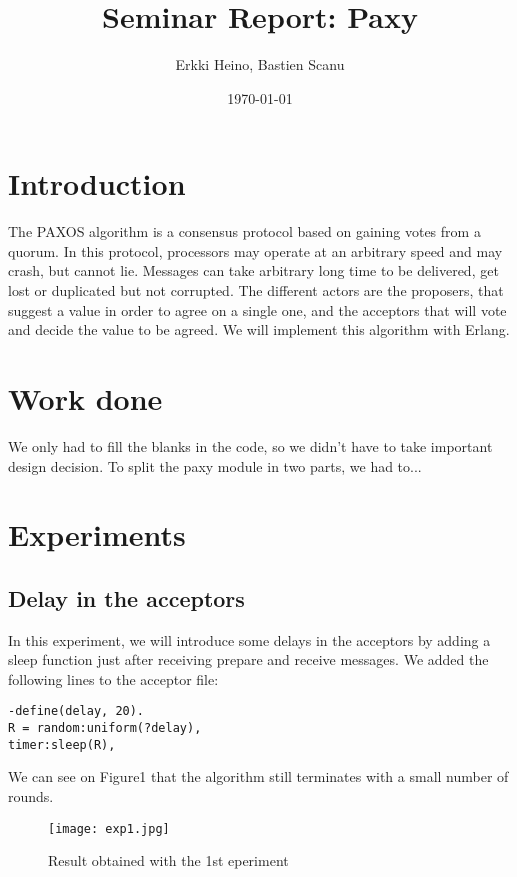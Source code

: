 \documentclass[a4paper, 11pt]{article}
\title{Seminar Report: Paxy}
\author{Erkki Heino, Bastien Scanu}
\date{\today{}}
\begin{document}
\maketitle

\section{Introduction}

The PAXOS algorithm is a consensus protocol based on gaining votes from a quorum. In this protocol, processors may operate at an arbitrary speed and may crash, but cannot lie. Messages can take arbitrary long time to be delivered, get lost or duplicated but not corrupted. The different actors are the proposers, that suggest a value in order to agree on a single one, and the acceptors that will vote and decide the value to be agreed. We will implement this algorithm with Erlang.

\section{Work done}

We only had to fill the blanks in the code, so we didn't have to take important design decision. To split the paxy module in two parts, we had to...

\section{Experiments}

\subsection{Delay in the acceptors}
In this experiment, we will introduce some delays in the acceptors by adding a sleep function just after receiving prepare and receive messages. We added the following lines to the acceptor file:
\begin{lstlisting}
-define(delay, 20).
R = random:uniform(?delay),
timer:sleep(R),
\end{lstlisting}
We can see on Figure1 that the algorithm still terminates with a small number of rounds.
\begin{figure}[h!]
\begin{center}
\texttt{[image: exp1.jpg]}
\caption{Result obtained with the 1st eperiment}
\end{center}
\end{figure}
\end{document}
